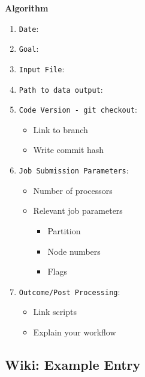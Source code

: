 \documentclass[
  letterpaper,
  DIV=11,
  numbers=noendperiod]{scrartcl}
\providecommand{\tightlist}{%
  \setlength{\itemsep}{0pt}\setlength{\parskip}{0pt}}\usepackage{longtable,booktabs,array}
\begin{document}
\begin{tcolorbox}[enhanced jigsaw, colframe=quarto-callout-color-frame, bottomrule=.15mm, toprule=.15mm, left=2mm, arc=.35mm, colback=white, rightrule=.15mm, opacityback=0, breakable, leftrule=.75mm]

\vspace{-3mm}\textbf{Algorithm}\vspace{3mm}

\begin{enumerate}
\def\labelenumi{\arabic{enumi}.}
\item
  \texttt{Date}:
\item
  \texttt{Goal}:
\item
  \texttt{Input\ File}:
\item
  \texttt{Path\ to\ data\ output}:
\item
  \texttt{Code\ Version\ -\ git\ checkout}:

  \begin{itemize}
  \tightlist
  \item
    Link to branch
  \item
    Write commit hash
  \end{itemize}
\item
  \texttt{Job\ Submission\ Parameters}:

  \begin{itemize}
  \tightlist
  \item
    Number of processors
  \item
    Relevant job parameters

    \begin{itemize}
    \tightlist
    \item
      Partition
    \item
      Node numbers
    \item
      Flags
    \end{itemize}
  \end{itemize}
\item
  \texttt{Outcome/Post\ Processing}:

  \begin{itemize}
  \tightlist
  \item
    Link scripts
  \item
    Explain your workflow
  \end{itemize}
\end{enumerate}

\end{tcolorbox}

\subsection{Wiki: Example Entry}\label{wiki-example-entry}
\end{document}
